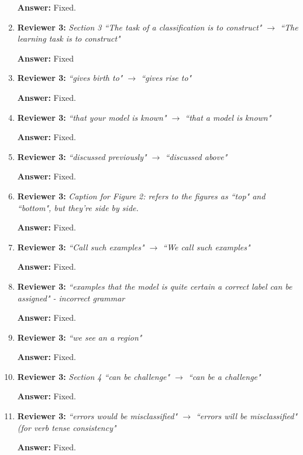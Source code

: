 \documentclass[letterpaper]{article}
\begin{document}
\begin{enumerate}
\textbf{Answer:} Fixed.

\item \textbf{Reviewer 3:} \emph{ Section 3 ``The task of a classification is to construct" $\rightarrow$ ``The learning task is to construct"}

\textbf{Answer:} Fixed

\item \textbf{Reviewer 3:} \emph{ ``gives birth to" $\rightarrow$ ``gives rise to"}

\textbf{Answer:} Fixed.

\item \textbf{Reviewer 3:} \emph{ ``that your model is known" $\rightarrow$ ``that a model is known"}

\textbf{Answer:} Fixed.

\item \textbf{Reviewer 3:} \emph{ ``discussed previously" $\rightarrow$ ``discussed above"}

\textbf{Answer:} Fixed.

\item \textbf{Reviewer 3:} \emph{ Caption for Figure 2: refers to the figures as ``top" and ``bottom", but they're side by side.}

\textbf{Answer:} Fixed.

\item \textbf{Reviewer 3:} \emph{ ``Call such examples" $\rightarrow$ ``We call such examples"}

\textbf{Answer:} Fixed.

\item \textbf{Reviewer 3:} \emph{ ``examples that the model is quite certain a correct label can be assigned" - incorrect grammar}

\textbf{Answer:} Fixed.

\item \textbf{Reviewer 3:} \emph{ ``we see an a region"}

\textbf{Answer:} Fixed.

\item \textbf{Reviewer 3:} \emph{ Section 4 ``can be challenge" $\rightarrow$ ``can be a challenge"}

\textbf{Answer:} Fixed.

\item \textbf{Reviewer 3:} \emph{ ``errors would be misclassified" $\rightarrow$ ``errors will be misclassified" (for verb tense consistency"}

\textbf{Answer:} Fixed.


\end{enumerate}
\end{document}
